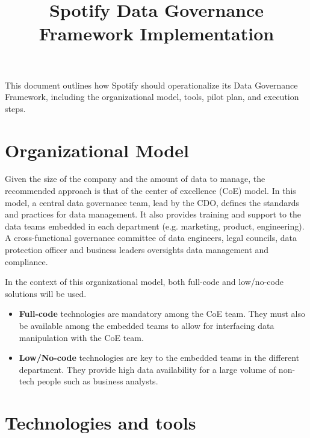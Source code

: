 \documentclass[11pt,a4paper,computermodern]{article}
\title{Spotify Data Governance Framework Implementation}
\date{}
\begin{document}
\maketitle

\vspace{-10mm}

This document outlines how Spotify should operationalize its Data Governance Framework, including the organizational model, tools, pilot plan, and execution steps.

\section*{Organizational Model}

Given the size of the company and the amount of data to manage, the recommended approach is that of the center of excellence (CoE) model. In this model, a central data governance team, lead by the CDO, defines the standards and practices for data management. It also provides training and support to the data teams embedded in each department (e.g. marketing, product, engineering). A cross-functional governance committee of data engineers, legal councils, data protection officer and business leaders oversights data management and compliance.

In the context of this organizational model, both full-code and low/no-code solutions will be used.
\begin{itemize}
	\item \textbf{Full-code} technologies are mandatory among the CoE team. They must also be available among the embedded teams to allow for interfacing data manipulation with the CoE team.
	\item \textbf{Low/No-code} technologies are key to the embedded teams in the different department. They provide high data availability for a large volume of non-tech people such as business analysts.
\end{itemize}


\section*{Technologies and tools}
\end{document}
